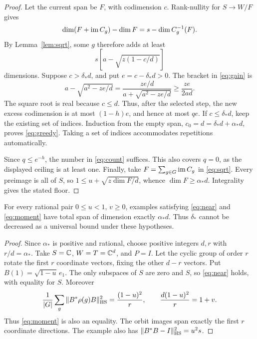 \begin{proof}
Let the current span be \(F\), with codimension \(c\). Rank-nullity
for \(S\to W/F\) gives
\[
 \dim(F+\operatorname{im} C_g)-\dim F=s-\dim C_g^{-1}(F).
\]
By Lemma~\ref{lem:sqrt}, some \(g\) therefore adds at least
\begin{equation}\label{eq:gain}
 s\left[a-\sqrt{z(1-c/d)}\right]
\end{equation}
dimensions. Suppose \(c>\delta_*d\), and put
\(e=c-\delta_*d>0\). The bracket in \eqref{eq:gain} is
\[
 a-\sqrt{a^2-ze/d}
 =\frac{ze/d}{a+\sqrt{a^2-ze/d}}
 \ge\frac{ze}{2ad}.
\]
The square root is real because \(c\le d\). Thus, after the
selected step, the new excess codimension is at most \((1-h)e\),
and hence at most \(qe\). If \(c\le\delta_*d\), keep the
existing set of indices. Induction from the empty span,
\(c_0=d=\delta_*d+\alpha_*d\), proves \eqref{eq:greedy}.
Taking a set of indices accommodates repetitions automatically.

Since \(q\le e^{-h}\), the number in \eqref{eq:count} suffices.
This also covers \(q=0\), as the displayed ceiling is at least one.
Finally, take \(F=\sum_{g\in G}\operatorname{im} C_g\) in
\eqref{eq:sqrt}. Every preimage is all of \(S\), so
\(1\le u+\sqrt{z\dim F/d}\), whence
\(\dim F\ge\alpha_*d\). Integrality gives the stated floor.
\end{proof}

\begin{proposition}\label{prop:sharp}
For every rational pair \(0\le u<1\), \(v\ge0\), examples
satisfying \eqref{eq:near} and \eqref{eq:moment} have total span of
dimension exactly \(\alpha_*d\). Thus \(\delta_*\) cannot be
decreased as a universal bound under these hypotheses.
\end{proposition}

\begin{proof}
Since \(\alpha_*\) is positive and rational, choose positive integers
\(d,r\) with \(r/d=\alpha_*\). Take \(S=\mathbb C\),
\(W=T=\mathbb C^d\), and \(P=I\). Let the cyclic group of order \(r\)
rotate the first \(r\) coordinate vectors, fixing the other
\(d-r\) vectors. Put \(B(1)=\sqrt{1-u}\,e_1\).
The only subspaces of \(S\) are zero and \(S\), so
\eqref{eq:near} holds, with equality for \(S\). Moreover
\[
 \frac1{|G|}\sum_g\|B^*\rho(g)B\|_{\mathrm{HS}}^2
 =\frac{(1-u)^2}{r},\qquad
 \frac{d(1-u)^2}{r}=1+v.
\]
Thus \eqref{eq:moment} is also an equality. The orbit images span
exactly the first \(r\) coordinate directions.
The example also has \(\|B^*B-I\|_{\mathrm{HS}}^2=u^2s\).
\end{proof}

